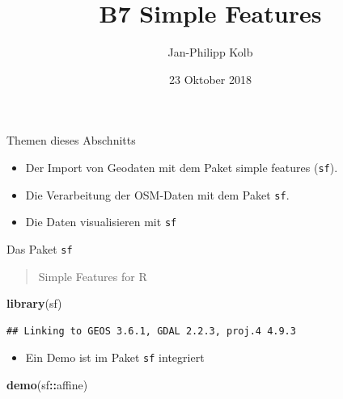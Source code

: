 \documentclass[ignorenonframetext,]{beamer}
\title{B7 Simple Features}
\author{Jan-Philipp Kolb}
\date{23 Oktober 2018}
\newenvironment{Shaded}{\begin{snugshade}}{\end{snugshade}}
\newcommand{\KeywordTok}[1]{\textcolor[rgb]{0.13,0.29,0.53}{\textbf{#1}}}
\newcommand{\NormalTok}[1]{#1}
\newcommand{\OperatorTok}[1]{\textcolor[rgb]{0.81,0.36,0.00}{\textbf{#1}}}
\providecommand{\tightlist}{%
  \setlength{\itemsep}{0pt}\setlength{\parskip}{0pt}}
\begin{document}
\frame{\titlepage}

\begin{frame}[fragile]{Themen dieses Abschnitts}
\protect\hypertarget{themen-dieses-abschnitts}{}

\begin{itemize}
\tightlist
\item
  Der Import von Geodaten mit dem Paket simple features (\texttt{sf}).
\item
  Die Verarbeitung der OSM-Daten mit dem Paket \texttt{sf}.
\item
  Die Daten visualisieren mit \texttt{sf}
\end{itemize}

\end{frame}

\begin{frame}[fragile]{Das Paket \texttt{sf}}
\protect\hypertarget{das-paket-sf}{}

\begin{quote}
Simple Features for R
\end{quote}

\begin{Shaded}
\begin{Highlighting}[]
\KeywordTok{library}\NormalTok{(sf)}
\end{Highlighting}
\end{Shaded}

\begin{verbatim}
## Linking to GEOS 3.6.1, GDAL 2.2.3, proj.4 4.9.3
\end{verbatim}

\begin{itemize}
\tightlist
\item
  Ein Demo ist im Paket \texttt{sf} integriert
\end{itemize}

\begin{Shaded}
\begin{Highlighting}[]
\KeywordTok{demo}\NormalTok{(sf}\OperatorTok{::}\NormalTok{affine)}
\end{Highlighting}
\end{Shaded}


\end{frame}
\end{document}
